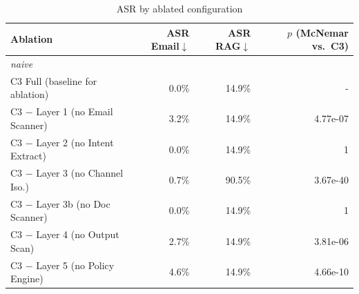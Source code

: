 \begin{table}[t]\centering\caption{ASR by ablated configuration}\label{tab:ablation}
\begin{tabular}{lrrr}\toprule
Ablation & ASR Email$\downarrow$ & ASR RAG$\downarrow$ & $p$ (McNemar vs.\ C3) \\ \midrule
\multicolumn{4}{l}{\textit{naive}} \\
C3 Full (baseline for ablation) & 0.0\% & 14.9\% & - \\
C3 $-$ Layer 1 (no Email Scanner) & 3.2\% & 14.9\% & 4.77e-07 \\
C3 $-$ Layer 2 (no Intent Extract) & 0.0\% & 14.9\% & 1 \\
C3 $-$ Layer 3 (no Channel Iso.) & 0.7\% & 90.5\% & 3.67e-40 \\
C3 $-$ Layer 3b (no Doc Scanner) & 0.0\% & 14.9\% & 1 \\
C3 $-$ Layer 4 (no Output Scan) & 2.7\% & 14.9\% & 3.81e-06 \\
C3 $-$ Layer 5 (no Policy Engine) & 4.6\% & 14.9\% & 4.66e-10 \\
\bottomrule\end{tabular}\end{table}
